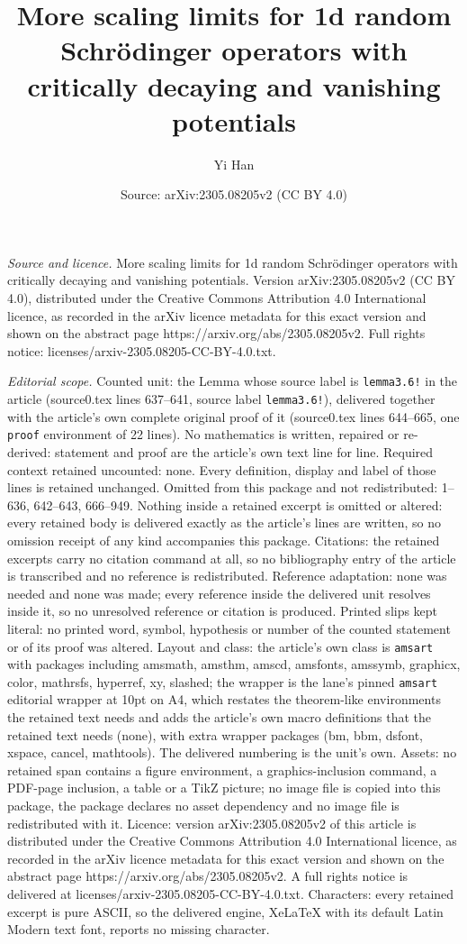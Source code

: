\documentclass[10pt,a4paper]{amsart}
\title[More scaling limits for 1d random Schr\"odinger operators wi]{More scaling limits for 1d random Schr\"odinger operators with critically decaying and vanishing potentials}
\author{Yi Han}
\date{Source: arXiv:2305.08205v2 (CC BY 4.0)}
\begin{document}
\maketitle

\noindent\emph{Source and licence.} More scaling limits for 1d random Schr\"odinger operators with critically decaying and vanishing potentials. Version arXiv:2305.08205v2 (CC BY 4.0), distributed under the Creative Commons Attribution 4.0 International licence, as recorded in the arXiv licence metadata for this exact version and shown on the abstract page https://arxiv.org/abs/2305.08205v2. Full rights notice: licenses/arxiv-2305.08205-CC-BY-4.0.txt.\par\smallskip

\noindent\textit{Editorial scope.} Counted unit: the Lemma whose source label is \texttt{lemma3.6!} in the article (source0.tex lines 637--641, source label \texttt{lemma3.6!}), delivered together with the article's own complete original proof of it (source0.tex lines 644--665, one \texttt{proof} environment of 22 lines). No mathematics is written, repaired or re-derived: statement and proof are the article's own text line for line. Required context retained uncounted: none. Every definition, display and label of those lines is retained unchanged. Omitted from this package and not redistributed: 1--636, 642--643, 666--949. Nothing inside a retained excerpt is omitted or altered: every retained body is delivered exactly as the article's lines are written, so no omission receipt of any kind accompanies this package. Citations: the retained excerpts carry no citation command at all, so no bibliography entry of the article is transcribed and no reference is redistributed. Reference adaptation: none was needed and none was made; every reference inside the delivered unit resolves inside it, so no unresolved reference or citation is produced. Printed slips kept literal: no printed word, symbol, hypothesis or number of the counted statement or of its proof was altered. Layout and class: the article's own class is \texttt{amsart} with packages including amsmath, amsthm, amscd, amsfonts, amssymb, graphicx, color, mathrsfs, hyperref, xy, slashed; the wrapper is the lane's pinned \texttt{amsart} editorial wrapper at 10pt on A4, which restates the theorem-like environments the retained text needs and adds the article's own macro definitions that the retained text needs (none), with extra wrapper packages (bm, bbm, dsfont, xspace, cancel, mathtools). The delivered numbering is the unit's own. Assets: no retained span contains a figure environment, a graphics-inclusion command, a PDF-page inclusion, a table or a TikZ picture; no image file is copied into this package, the package declares no asset dependency and no image file is redistributed with it. Licence: version arXiv:2305.08205v2 of this article is distributed under the Creative Commons Attribution 4.0 International licence, as recorded in the arXiv licence metadata for this exact version and shown on the abstract page https://arxiv.org/abs/2305.08205v2. A full rights notice is delivered at licenses/arxiv-2305.08205-CC-BY-4.0.txt. Characters: every retained excerpt is pure ASCII, so the delivered engine, XeLaTeX with its default Latin Modern text font, reports no missing character.
\end{document}
